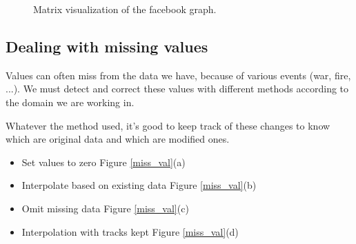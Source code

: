 \begin{figure} [h] %
\centerline{
}
\caption{\label{pic:fb} Matrix visualization of the facebook graph.} 
\end{figure}


\subsection{Dealing with missing values}

Values can often miss from the data we have, because of various events (war, fire, ...). We must detect and correct these values with different methods according to the domain we are working in.

Whatever the method used, it's good to keep track of these changes to know which are original data and which are modified ones.

\begin{itemize}
  \item Set values to zero Figure \ref{miss_val}(a)
  \item Interpolate based on existing data Figure \ref{miss_val}(b)
  \item Omit missing data Figure \ref{miss_val}(c)
  \item Interpolation with tracks kept Figure \ref{miss_val}(d)
\end{itemize}

